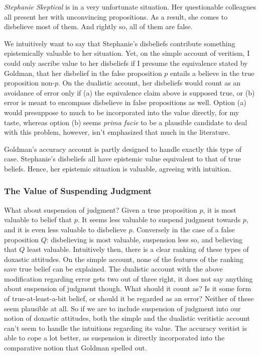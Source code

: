 \documentclass[12pt,numbers=noenddot]{scrartcl}
\begin{document}
\begin{description}
   \item \emph{Stephanie Skeptical} is in a very unfortunate situation. Her questionable colleagues all present her with unconvincing propositions. As a result, she comes to disbelieve most of them. And rightly so, all of them are false.
\end{description}

We intuitively want to say that Stephanie's disbeliefs contribute something epistemically valuable to her situation. Yet, on the simple account of veritism, I could only ascribe value to her disbeliefs if I presume the equivalence stated by Goldman, that her disbelief in the false proposition $p$ entails a believe in the true proposition non-$p$. On the dualistic account, her disbeliefs would count as an avoidance of error only if (a) the equivalence claim above is supposed true, or (b) error is meant to encompass disbelieve in false propositions as well. Option (a) would presuppose to much to be incorporated into the value directly, for my taste, whereas option (b) seems \emph{prima facie} to be a plausible candidate to deal with this problem, however, isn't emphasized that much in the literature.

Goldman's accuracy account is partly designed to handle exactly this type of case. Stephanie's disbeliefs all have epistemic value equivalent to that of true beliefs. Hence, her epistemic situation is valuable, agreeing with intuition.

\subsubsection{The Value of Suspending Judgment}

What about suspension of judgment? Given a true proposition $p$, it is most valuable to belief that $p$. It seems less valuable to suspend judgment towards $p$, and it is even less valuable to disbelieve $p$. Conversely in the case of a false proposition $Q$: disbelieving is most valuable, suspension less so, and believing that $Q$ least valuable. Intuitively then, there is a clear ranking of these types of doxastic attitudes. On the simple account, none of the features of the ranking save true belief can be explained. The dualistic account with the above modification regarding error gets two out of three right, it does not say anything about suspension of judgment though. What should it count as? Is it some form of true-at-least-a-bit belief, or should it be regarded as an error? Neither of these seem plausible at all. So if we are to include suspension of judgment into our notion of doxastic attitudes, both the simple and the dualistic veritistic account can't seem to handle the intuitions regarding its value. The accuracy veritist is able to cope a lot better, as suspension is directly incorporated into the comparative notion that Goldman spelled out.
\end{document}
